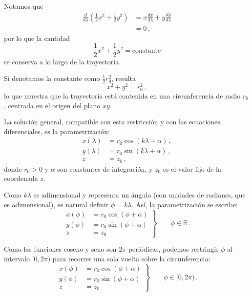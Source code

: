 \documentclass[../apunte_mecanica_clasica.tex]{subfiles}%
\begin{document}
Notamos que
\begin{align*}
\frac{d}{d\lambda}\left(\frac{1}{2}x^2 + \frac{1}{2}y^2\right) &= x \frac{dx}{d\lambda} + y \frac{dy}{d\lambda} \\&= 0\,,
\end{align*}
por lo que la cantidad
\begin{equation*}
\frac{1}{2}x^2 + \frac{1}{2}y^2 = \text{constante}
\end{equation*}
se conserva a lo largo de la trayectoria.

Si denotamos la constante como $\frac{1}{2}r_0^2$, resulta
\begin{equation*}
x^2 + y^2 = r_0^2\,,
\end{equation*}
lo que muestra que la trayectoria está contenida en una circunferencia de radio $r_0$, centrada en el origen del plano $xy$.

La solución general, compatible con esta restricción y con las ecuaciones diferenciales, es la parametrización:
\begin{align*}
x(\lambda) &= r_0 \cos(k\lambda + \alpha)\,, \\
y(\lambda) &= r_0 \sin(k\lambda + \alpha)\,, \\
z &= z_0 \,,
\end{align*}
donde $r_0 > 0$ y $\alpha$ son constantes de integración, y $z_0$ es el valor fijo de la coordenada $z$.

Como $k\lambda$ es adimensional y representa un ángulo (con unidades de radianes, que es adimensional), es natural definir $\phi = k\lambda$. Así, la parametrización se escribe:
\begin{equation*}
\left.
\begin{aligned}
x(\phi) &= r_0 \cos(\phi + \alpha) \\
y(\phi) &= r_0 \sin(\phi + \alpha) \\
z &= z_0 
\end{aligned}
\right\}
\qquad \phi \in \mathbb{R} \,.
\end{equation*}

Como las funciones coseno y seno son $2\pi$-periódicas, podemos restringir $\phi$ al intervalo $[0, 2\pi)$ para recorrer una sola vuelta sobre la circunferencia:
\begin{equation}
\left.
\begin{aligned}
x(\phi) &= r_0 \cos(\phi + \alpha) \\
y(\phi) &= r_0 \sin(\phi + \alpha) \\
z &= z_0 
\end{aligned}
\right\}
\qquad \phi \in[0,2\pi) \,.
\end{equation}
\end{document}
